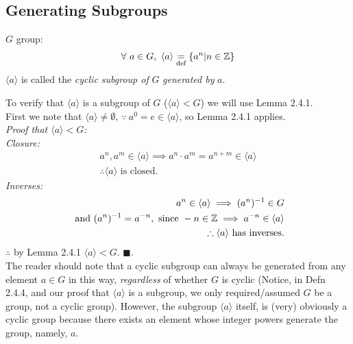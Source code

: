 \subsection{Generating Subgroups}
\begin{definition}
$G$ group:
\begin{align}
    \forall \ a\in G, \ \langle a \rangle \underset{\text{def}}{=} \{a^n |n\in {\mathbb{Z}}\}\nonumber
\end{align}
$\langle a \rangle$ is called the \textit{cyclic subgroup of }$G$ \textit{generated by}
$a$.\steezybreak

\end{definition}
To verify that $\langle a \rangle$ is a subgroup of $G$ ($\langle a \rangle<G$) we will use Lemma
2.4.1. \\
First we note that $\langle a \rangle\neq \emptyset, \ \because \ a^0=e\in \langle a \rangle$, so
Lemma 2.4.1 applies.\\
\textit{Proof that $\langle a \rangle < G$:}\\
\textit{Closure:}
\begin{align}
    a^n,a^m\in \langle a \rangle \implies a^n\cdot a^m=a^{n+m}\in \langle a \rangle \nonumber\\
    \therefore \langle a \rangle \text{ is closed.}\nonumber
\end{align}
\textit{Inverses:}
\begin{align}
    a^n\in \langle a \rangle \implies (a^n)^{-1}\in G \nonumber\\
    \text{ and }(a^n)^{-1}=a^{-n}, \text{ since } -n\in {\mathbb{Z}} \implies a^{-n}\in \langle a \rangle \nonumber\\
    \therefore \langle a \rangle \text{ has inverses.} \nonumber
\end{align}
$\therefore$ by Lemma 2.4.1 $\langle a \rangle < G$. $\blacksquare$. \steezybreak \\
The reader should note that a cyclic subgroup can always be generated from any element $a\in G$ in
this way, \textit{regardless} of whether $G$ is cyclic (Notice, in Defn 2.4.4, and our proof that
$\langle a \rangle$ is a subgroup, we only required/assumed $G$ be a group, not a cyclic group).
However, the subgroup $\langle a \rangle$ itself, is (very) obviously a cyclic group because there
exists an element whose integer powers generate the group, namely, $a$.
